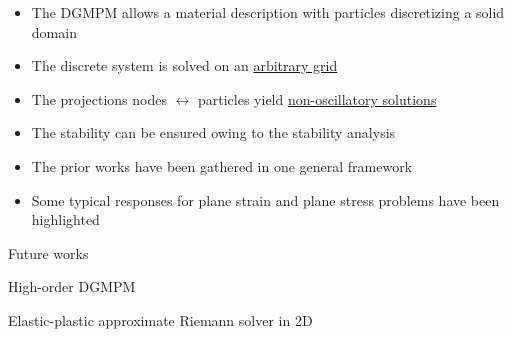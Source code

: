 \documentclass[11pt,aspectratio=169]{beamer}
\begin{document}
\begin{frame}[standout]{}
  \begin{scriptsize}
    \begin{block}{}
      \begin{itemize}
      \item[] The DGMPM allows a material description with particles discretizing a solid domain
      \item[] The discrete system is solved on an \underline{arbitrary grid}
      \item[] The projections nodes $\leftrightarrow$ particles yield \underline{non-oscillatory solutions}
      \item[] The stability can be ensured owing to the stability analysis
      \end{itemize}

  \end{block}

  \begin{block}{}
    \begin{itemize}
    \item[] The prior works have been gathered in one general framework
    \item[] Some typical responses for plane strain and plane stress problems have been highlighted
    \end{itemize}
  \end{block}

  \end{scriptsize}
\end{frame}

\begin{frame}{Future works}

  \begin{block}{High-order DGMPM}
    
  \end{block}


  \begin{block}{Elastic-plastic approximate Riemann solver in 2D}
    
  \end{block}


\end{frame}
\end{document}
